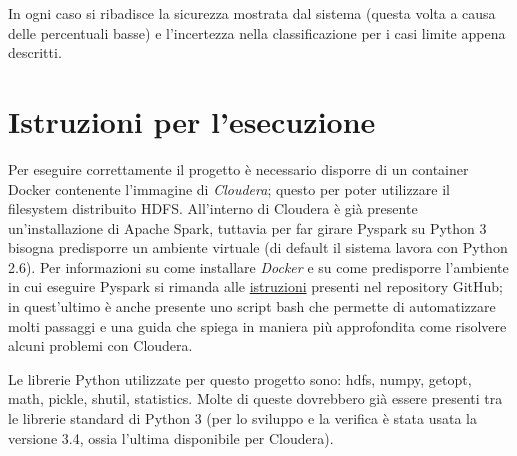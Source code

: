 \documentclass[titlepage]{article}
\begin{document}
In ogni caso si ribadisce la sicurezza mostrata dal sistema (questa volta a causa delle percentuali basse) e l'incertezza nella classificazione per i casi limite appena descritti.


\newpage
\section{Istruzioni per l'esecuzione}
\label{sec:5}
Per eseguire correttamente il progetto è necessario disporre di un container Docker contenente l'immagine di \textit{Cloudera}; questo per poter utilizzare il filesystem distribuito HDFS. All'interno di Cloudera è già presente un'installazione di Apache Spark, tuttavia per far girare Pyspark su Python 3 bisogna predisporre un ambiente virtuale (di default il sistema lavora con Python 2.6). Per informazioni su come installare \textit{Docker} e su come predisporre l'ambiente in cui eseguire Pyspark si rimanda alle \href{https://github.com/zampierida98/authorship#esecuzione-su-cloudera}{istruzioni} presenti nel repository GitHub; in quest'ultimo è anche presente uno script bash che permette di automatizzare molti passaggi e una guida che spiega in maniera più approfondita come risolvere alcuni problemi con Cloudera.

Le librerie Python utilizzate per questo progetto sono: hdfs, numpy, getopt, math, pickle, shutil, statistics. Molte di queste dovrebbero già essere presenti tra le librerie standard di Python 3 (per lo sviluppo e la verifica è stata usata la versione 3.4, ossia l'ultima disponibile per Cloudera).
\end{document}
